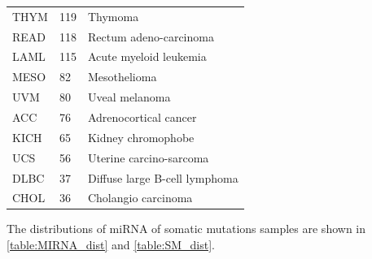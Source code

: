 \begin{table} [!ht]
\begin{center}
\begin{tabular}{l|l|l}
         THYM & 119  & Thymoma	 \\%
         READ & 118  & Rectum adeno-carcinoma \\%
         LAML & 115  & Acute myeloid leukemia	\\%
         MESO & 82  & Mesothelioma	\\%
         UVM & 80  & Uveal melanoma	 \\%
         ACC & 76  & Adrenocortical cancer	\\%
         KICH & 65  & Kidney chromophobe	\\%
         UCS & 56  & Uterine carcino-sarcoma	 \\%
         DLBC & 37  & Diffuse large B-cell lymphoma	\\%
         CHOL & 36  & Cholangio carcinoma	 \\%
         \bottomrule
    \end{tabular}
    \end{center}
\end{table}
The distributions of miRNA of somatic mutations samples are shown in \cref{table:MIRNA_dist} and \cref{table:SM_dist}. 
